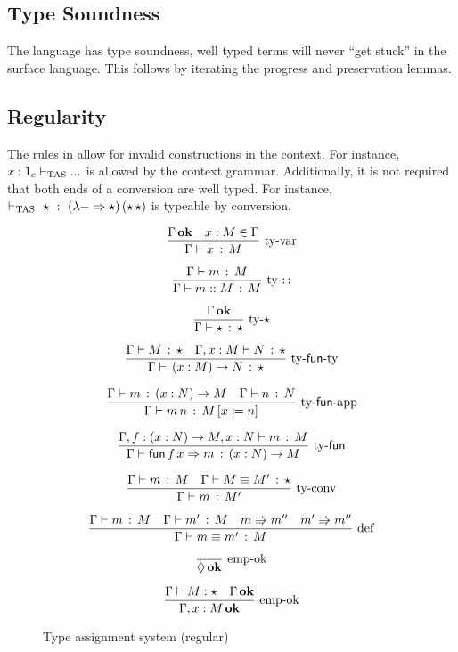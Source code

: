 \subsection{Type Soundness}

The language has type soundness, well typed terms will never ``get stuck'' in the surface language.
This follows by iterating the progress and preservation lemmas.




\subsection{Regularity}
The rules in  allow for invalid constructions in the context.
For instance, $x:1_{c}\vdash_{\mathrm{TAS}}...$ is allowed by the context grammar.
Additionally, it is not required that both ends of a conversion are well typed.
For instance, $\vdash_{\mathrm{TAS}}\ \star\ :\ (\lambda - \Rightarrow \star)\,(\star\,\star)$ is typeable by conversion.


\begin{figure}
\[
\frac{\Gamma\,\mathbf{ok}\quad x:M\in\Gamma}{\Gamma\vdash{}x\,:\,M}\,\operatorname{ty-var}
\]

\[
\frac{\Gamma\vdash{}m\,:\,M}{\Gamma\vdash{}m::M\,:\,M}\,\operatorname{ty-::}
\]

\[
\frac{\Gamma\,\mathbf{ok}}{\Gamma\vdash{}\star\,:\,\star}\,\operatorname{ty-\star}
\]

\[
\frac{\Gamma\vdash{}M\,:\,\star\quad\Gamma,x:M\vdash{}N\,:\,\star}{\Gamma\vdash{}\left(x:M\right)\rightarrow N\,:\,\star}\,\operatorname{ty-\mathsf{fun}-ty}
\]

\[
\frac{\Gamma\vdash{}m\,:\,\left(x:N\right)\rightarrow M\quad\Gamma\vdash{}n\,:\,N}{\Gamma\vdash{}m\,n\,:\,M\left[x\coloneqq n\right]}\,\operatorname{ty-\mathsf{fun}-app}
\]

\[
\frac{\Gamma,f:\left(x:N\right)\rightarrow M,x:N\vdash{}m\,:\,M}{\Gamma\vdash{}\mathsf{fun}\,f\,x\Rightarrow m\,:\,\left(x:N\right)\rightarrow M}\,\operatorname{ty-\mathsf{fun}}
\]

\[
\frac{\Gamma\vdash{}m\,:\,M\quad\Gamma\vdash{}M\equiv M'\,:\,\star}{\Gamma\vdash{}m\,:\,M'}\,\operatorname{ty-conv}
\]

\[
\frac{\Gamma\vdash{}m\,:\,M\quad\Gamma\vdash{}m'\,:\,M\quad m\Rrightarrow m''\quad m'\Rrightarrow m''}{\Gamma\vdash{}m\equiv m'\,:\,M}\,\operatorname{def}
\]

\[
\frac{\ }{\lozenge\,\mathbf{ok}}\,\rulename{emp-ok}
\]

\[
\frac{\Gamma\vdash{}M:\star\quad\Gamma\,\mathbf{ok}}{\Gamma,x:M\,\mathbf{ok}}\,\operatorname{emp-ok}
\]
\caption{Type assignment system (regular)}
\label{fig:surface-tas-reg}
\end{figure}

